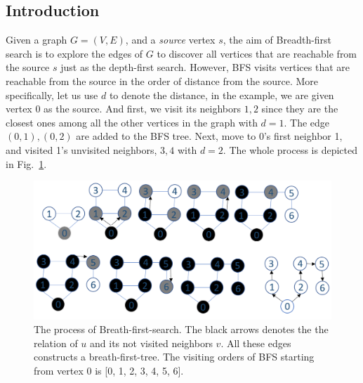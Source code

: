 \documentclass[main.tex]{subfiles}
\begin{document}
\subsection{Introduction} 
 Given a graph $G = (V, E)$, and a \textit{source} vertex $s$, the aim of Breadth-first search is to explore the edges of $G$ to discover all vertices that are reachable from the source $s$ just as the depth-first search. However, BFS visits vertices that are reachable from the source in the order of distance from the source. More specifically, let us use $d$ to denote the distance, in the example, we are given vertex $0$ as the source. And first, we visit its neighbors $1, 2$ since they are the closest ones among all the other vertices in the graph with $d=1$. The edge $(0, 1), (0, 2)$ are added to the BFS tree. Next, move to 0's first neighbor 1, and visited 1's unvisited neighbors, $3, 4$ with $d=2$.  The whole process is depicted in Fig.~\ref{fig:bfs_search}.  
 \begin{figure}[!ht]
    \centering
    \includegraphics[width=0.9\columnwidth]{fig/bfs_example_1.png}
    \caption{The process of Breath-first-search. The black arrows denotes the the relation of $u$ and its not visited neighbors $v$. All these edges constructs a breath-first-tree. The visiting orders of BFS starting from vertex $0$ is [0, 1, 2, 3, 4, 5, 6].}
    \label{fig:bfs_search}
\end{figure}
\end{document}
